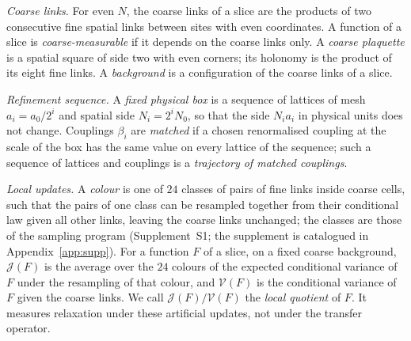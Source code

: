 \emph{Coarse links.} For even $N$, the coarse links of a slice are the products of two consecutive fine
spatial links between sites with even coordinates. A function of a slice is \emph{coarse-measurable} if it
depends on the coarse links only. A \emph{coarse plaquette} is a spatial square of side two with even corners;
its holonomy is the product of its eight fine links. A \emph{background} is a configuration of the coarse
links of a slice.

\emph{Refinement sequence.} A \emph{fixed physical box} is a sequence of lattices of mesh $a_i=a_0/2^i$ and
spatial side $N_i=2^iN_0$, so that the side $N_ia_i$ in physical units does not change. Couplings $\beta_i$ are
\emph{matched} if a chosen renormalised coupling at the scale of the box has the same value on every lattice
of the sequence; such a sequence of lattices and couplings is a \emph{trajectory of matched couplings}.

\emph{Local updates.} A \emph{colour} is one of $24$ classes of pairs of fine links inside coarse cells, such
that the pairs of one class can be resampled together from their conditional law given all other links,
leaving the coarse links unchanged; the classes are those of the sampling program (Supplement~S1; the supplement is catalogued in
Appendix~\ref{app:supp}). For a function
$F$ of a slice, on a fixed coarse background, $\mathcal J(F)$ is the average over the $24$ colours of the
expected conditional variance of $F$ under the resampling of that colour, and $\mathcal V(F)$ is the
conditional variance of $F$ given the coarse links. We call $\mathcal J(F)/\mathcal V(F)$ the \emph{local
quotient} of $F$. It measures relaxation under these artificial updates, not under the transfer operator.

